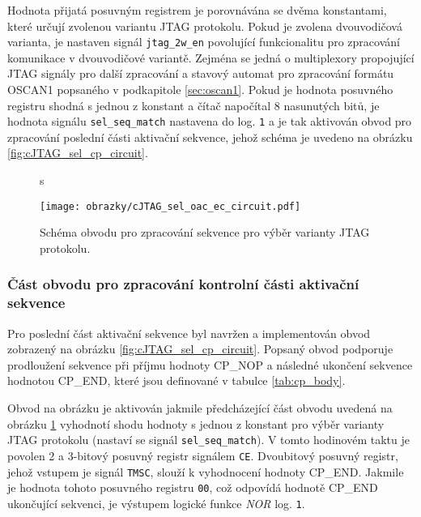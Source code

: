 Hodnota přijatá posuvným registrem je porovnávána se dvěma konstantami, které určují zvolenou variantu \acs{JTAG} protokolu. Pokud je zvolena dvouvodičová varianta, je nastaven signál \texttt{jtag\_2w\_en} povolující funkcionalitu pro zpracování komunikace v dvouvodičové variantě. Zejména se jedná o multiplexory propojující \acs{JTAG} signály pro další zpracování a stavový automat pro  zpracování formátu OSCAN1 popsaného v podkapitole \ref{sec:oscan1}. Pokud je hodnota posuvného registru shodná s jednou z konstant a čítač napočítal 8 nasunutých bitů, je hodnota signálu \texttt{sel\_seq\_match} nastavena do log. \texttt{1} a je tak aktivován obvod pro zpracování poslední části aktivační sekvence, jehož schéma je uvedeno na obrázku \ref{fig:cJTAG_sel_cp_circuit}. 

\begin{figure}[H]s
  \begin{center}
    \texttt{[image: obrazky/cJTAG\_sel\_oac\_ec\_circuit.pdf]}
  \end{center}
  \caption{Schéma obvodu pro zpracování sekvence pro výběr varianty \acs{JTAG} protokolu.}
	\label{fig:cJTAG_sel_oac_ec_circuit}
\end{figure}

\subsubsection{Část obvodu pro zpracování kontrolní části aktivační sekvence}
Pro poslední část aktivační sekvence byl navržen a implementován obvod zobrazený na obrázku \ref{fig:cJTAG_sel_cp_circuit}. Popsaný obvod podporuje prodloužení sekvence při příjmu hodnoty CP\_NOP a následné ukončení sekvence hodnotou CP\_END, které jsou definované v tabulce \ref{tab:cp_body}. %

Obvod na obrázku je aktivován jakmile předcházející část obvodu uvedená na obrázku \ref{fig:cJTAG_sel_oac_ec_circuit} vyhodnotí shodu hodnoty s jednou z konstant pro výběr varianty \acs{JTAG} protokolu (nastaví se signál \texttt{sel\_seq\_match}). V tomto hodinovém taktu je povolen 2 a 3-bitový posuvný registr signálem \texttt{CE}. Dvoubitový posuvný registr, jehož vstupem je signál \texttt{\acs{TMSC}}, slouží k vyhodnocení hodnoty CP\_END. Jakmile je hodnota tohoto posuvného registru \texttt{00}, což odpovídá hodnotě CP\_END ukončující sekvenci, je výstupem logické funkce \textit{NOR} log. \texttt{1}.

